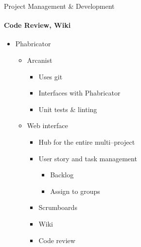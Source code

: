 \begin{frame}[t]{Project Management \& Development}\framesubtitle{Code Review, Wiki}
    \begin{itemize}
        \item Phabricator
        \begin{itemize}
            \item Arcanist
            \begin{itemize}
                \item Uses git
                \item Interfaces with Phabricator
                \item Unit tests \& linting
            \end{itemize}
            \item Web interface
            \begin{itemize}
                \item Hub for the entire multi--project
                \item User story and task management
                \begin{itemize}
                    \item Backlog
                    \item Assign to groups
                \end{itemize}
                \item Scrumboards
                \item Wiki
                \item Code review
            \end{itemize}
        \end{itemize}
    \end{itemize}
\end{frame}
